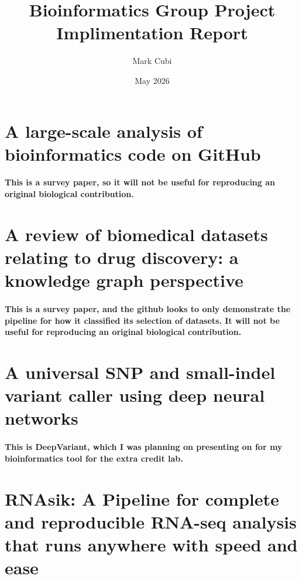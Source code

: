\documentclass{article}
\title{Bioinformatics Group Project Implimentation Report}
\author{Mark Cubi}
\date{May 2026}
\begin{document}
\maketitle

\section{A large-scale analysis of bioinformatics code on GitHub \cite{russell2018github_analysis}}

\paragraph{
This is a survey paper, so it will not be useful for reproducing an original biological contribution.
}

\section{A review of biomedical datasets relating to drug discovery: a knowledge graph perspective \cite{bonner2022kg_drug_discovery}}

\paragraph{
This is a survey paper, and the github looks to only demonstrate the pipeline for how it classified its selection of datasets. It will not be useful for reproducing an original biological contribution.
}

\section{A universal SNP and small-indel variant caller using deep neural networks \cite{poplin2018deepvariant}}

\paragraph{
    This is DeepVariant, which I was planning on presenting on for my bioinformatics tool for the extra credit lab.
}

\section{RNAsik: A Pipeline for complete and reproducible RNA-seq analysis that runs anywhere with speed and ease \cite{rnAsik2019}}
\end{document}
